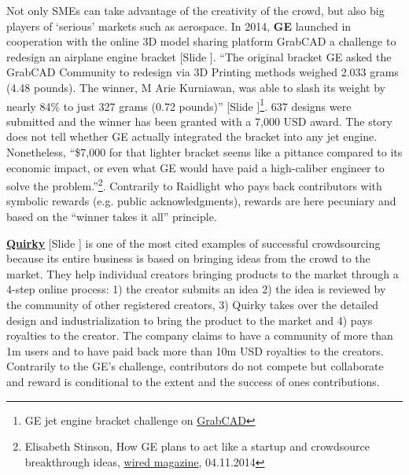 \documentclass{article}
\newcounter{slide}
\begin{document}
Not only SMEs can take advantage of the creativity of the crowd, but also big players of `serious' markets such as aerospace. In 2014, \textbf{GE} launched in cooperation with the online 3D model sharing platform GrabCAD a challenge to redesign an airplane engine bracket {\color{blue} [Slide ]}. ``The original bracket GE asked the GrabCAD Community to redesign via 3D Printing methods weighed 2.033 grams (4.48 pounds). The winner, M Arie Kurniawan, was able to slash its weight by nearly 84\% to just 327 grams (0.72 pounds)''{\color{blue} [Slide ]}\footnote{GE jet engine bracket challenge on \href{https://grabcad.com/challenges/ge-jet-engine-bracket-challenge}{GrabCAD}}. 637 designs were submitted and the winner has been granted with a 7,000 USD award. The story does not tell whether GE actually integrated the bracket into any jet engine. Nonetheless, ``\$7,000 for that lighter bracket seems like a pittance compared to its economic impact, or even what GE would have paid a high-caliber engineer to solve the problem.''\footnote{Elisabeth Stinson, How GE plans to act like a startup and crowdsource breakthrough ideas, \href{https://www.wired.com/2014/04/how-ge-plans-to-act-like-a-startup-and-crowdsource-great-ideas/}{wired magazine}, 04.11.2014}. Contrarily to Raidlight who pays back contributors with symbolic rewards (e.g. public acknowledgments), rewards are here pecuniary and based on the ``winner takes it all'' principle.

\textbf{\href{https://quirky.com}{Quirky}} {\color{blue}[Slide ]} is one of the most cited examples of successful crowdsourcing because its entire business is based on bringing ideas from the crowd to the market. They help individual creators bringing products to the market through a 4-step online process: 1) the creator submits an idea 2) the idea is reviewed by the community of other registered creators, 3) Quirky takes over the detailed design and industrialization to bring the product to the market and 4) pays royalties to the creator. The company claims to have a community of more than 1m users and to have  paid back more than 10m USD royalties to the creators. Contrarily to the GE's challenge, contributors do not compete but collaborate and reward is conditional to the extent and the success of ones contributions. \begin{comment} https://www.emeraldinsight.com/doi/pdfplus/10.1108/JBS-10-2016-0120 \end{comment}
\end{document}
